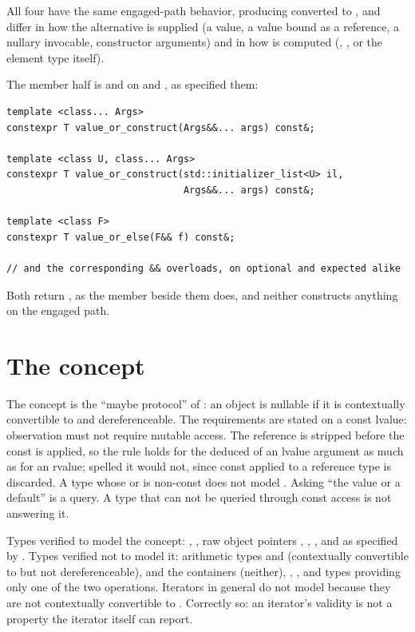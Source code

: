 \documentclass[a4paper,10pt,oneside,openany,final,article]{memoir}
\begin{document}
All four have the same engaged-path behavior, producing
converted to , and differ in how the alternative is supplied
(a value, a value bound as a reference, a nullary invocable, constructor
arguments) and in how  is computed (,
, or the element type itself).

The member half is  and  on
 and , as \cite{P3413R0}
specified them:

\begin{verbatim}
template <class... Args>
constexpr T value_or_construct(Args&&... args) const&;

template <class U, class... Args>
constexpr T value_or_construct(std::initializer_list<U> il,
                               Args&&... args) const&;

template <class F>
constexpr T value_or_else(F&& f) const&;

// and the corresponding && overloads, on optional and expected alike
\end{verbatim}

Both return , as the member  beside them does, and
neither constructs anything on the engaged path.

\section{The  concept}

The concept is the ``maybe protocol'' of \cite{P1255R13}: an object is
nullable if it is contextually convertible to  and
dereferenceable. The requirements are stated on a const lvalue: observation
must not require mutable access. The reference is stripped before the const
is applied, so the rule holds for the deduced  of an lvalue argument
as much as for an rvalue; spelled  it would not, since const
applied to a reference type is discarded. A type whose 
or  is non-const does not model . Asking
``the value or a default'' is a query. A type that can not be queried
through const access is not answering it.

Types verified to model the concept: ,
, raw object pointers ,
, , and
 as specified by \cite{P2988R12}. Types verified
not to model it: arithmetic types and  (contextually convertible
to  but not dereferenceable),  and the
containers (neither), , , and types
providing only one of the two operations. Iterators in general do not model
 because they are not contextually convertible to
. Correctly so: an iterator's validity is not a property the
iterator itself can report.
\end{document}
